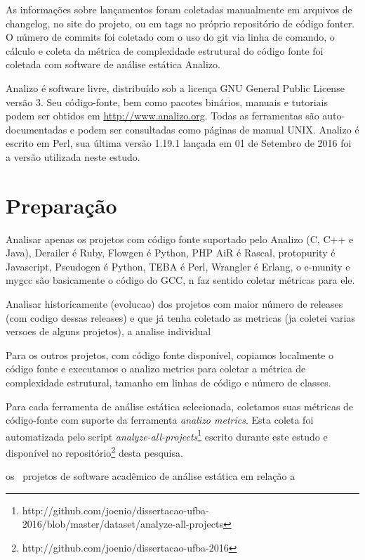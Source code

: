 As informações sobre lançamentos foram coletadas manualmente em arquivos de
changelog, no site do projeto, ou em tags no próprio repositório de código
fonter. O número de commits foi coletado com o uso do git via linha de comando,
o cálculo e coleta da métrica de complexidade estrutural do código fonte foi
coletada com software de análise estática Analizo.

Analizo é software livre, distribuído sob a licença GNU General Public License
versão 3. Seu código-fonte, bem como pacotes binários, manuais e tutoriais
podem ser obtidos em \url{http://www.analizo.org}. Todas as ferramentas são
auto-documentadas e podem ser consultadas como páginas de manual UNIX. 
Analizo é escrito em Perl, sua última versão 1.19.1 lançada em 01 de Setembro de 2016
foi a versão utilizada neste estudo.

\section{Preparação} \label{estudo3:preparacao}

Analisar apenas os projetos com código fonte suportado pelo Analizo (C, C++ e Java),
Derailer é Ruby, Flowgen é Python, PHP AiR é Rascal, protopurity é Javascript,
Pseudogen é Python, TEBA é Perl, Wrangler é Erlang,
o e-munity e mygcc são basicamente o código do GCC, n faz sentido coletar métricas para ele.

Analisar historicamente (evolucao) dos projetos com maior número de releases (com codigo dessas releases)
e que já tenha coletado as metricas (ja coletei varias versoes de alguns projetos), a analise
individual

Para os outros projetos, com código fonte disponível, copiamos localmente o código fonte
e executamos o analizo metrics para coletar a métrica de complexidade estrutural, tamanho em
linhas de código e número de classes.


Para cada ferramenta de análise estática selecionada, coletamos  suas métricas de código-fonte
com suporte da ferramenta {\it analizo metrics}. 
Esta coleta foi automatizada pelo script {\it
analyze-all-projects}\footnote{http://github.com/joenio/dissertacao-ufba-2016/blob/master/dataset/analyze-all-projects}
escrito durante este estudo e  disponível no
repositório\footnote{http://github.com/joenio/dissertacao-ufba-2016} desta
pesquisa.



os \SoftwareCount \ projetos de software acadêmico de análise estática
em relação a 

